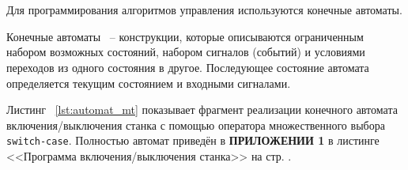\begin{comment}
void writeOutputs() \{ & \textcolor{exComm}{// Запись выходов} \\
\quad Servo[0].IO[0].DataOut[0] = mt.PultOut.PultLed[0]; & \textcolor{exComm}{// } \\
\quad Servo[0].IO[0].DataOut[1] = mt.PultOut.PultLed[1]; & \textcolor{exComm}{// } \\
\quad Servo[0].IO[0].DataOut[2] = mt.PultOut.PultLed[2]; & \textcolor{exComm}{// } \\
\quad Servo[0].IO[1].DataOut[0] = mt.OUT.Outputs[0]; & \textcolor{exComm}{// } \\
\} &  \\
\vdots &  \\
\end{tabular}

\end{pExample}  
\end{comment}









\section{}

Для программирования алгоритмов управления используются конечные автоматы. 

Конечные автоматы ~-- конструкции, которые описываются ограниченным набором возможных состояний, набором сигналов (событий) и условиями переходов из одного состояния в другое. Последующее состояние автомата определяется текущим состоянием и входными сигналами.

Листинг ~\ref{lst:automat_mt} показывает фрагмент реализации конечного автомата включения/выключения станка с помощью оператора множественного выбора \texttt{switch-case}. Полностью автомат приведён в \textbf{ПРИЛОЖЕНИИ 1} в листинге <<Программа включения/выключения станка>> на стр. \pageref{MtOnOff}.\killoverfullbefore \BL


